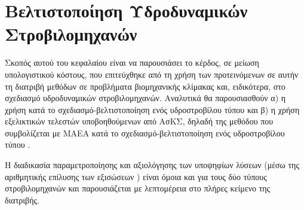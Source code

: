 \ifpdf
    \graphicspath{{5/figures/PNG/}{5/figures/PDF/}{4/figures/}}
\else
    \graphicspath{{5/figures/EPS/}{5/figures/}}
\fi

\chapter{Βελτιστοποίηση Υδροδυναμικών Στροβιλομηχανών}  %
Σκοπός αυτού του κεφαλαίου είναι να παρουσιάσει το κέρδος, σε μείωση υπολογιστικού κόστους, που επιτεύχθηκε από τη χρήση των προτεινόμενων σε αυτήν τη διατριβή μεθόδων σε προβλήματα βιομηχανικής κλίμακας και, ειδικότερα, στο σχεδιασμό υδροδυναμικών στροβιλομηχανών. Αναλυτικά θα παρουσιασθούν α) η χρήση  κατά το σχεδιασμό-βελτιστοποίηση ενός υδροστροβίλου τύπου  και β) η χρήση  εξελικτικών τελεστών υποβοηθούμενων από ΑσΚΣ, δηλαδή της μεθόδου που συμβολίζεται με ΜΑΕΑ κατά το σχεδιασμό-βελτιστοποίηση ενός υδροστροβίλου τύπου . 

Η διαδικασία παραμετροποίησης και αξιολόγησης των υποψηφίων λύσεων (μέσω της αριθμητικής επίλυσης των εξισώσεων ) είναι όμοια και για τους δύο τύπους στροβιλομηχανών και παρουσιάζεται με λεπτομέρεια στο πλήρες κείμενο της διατριβής.   

